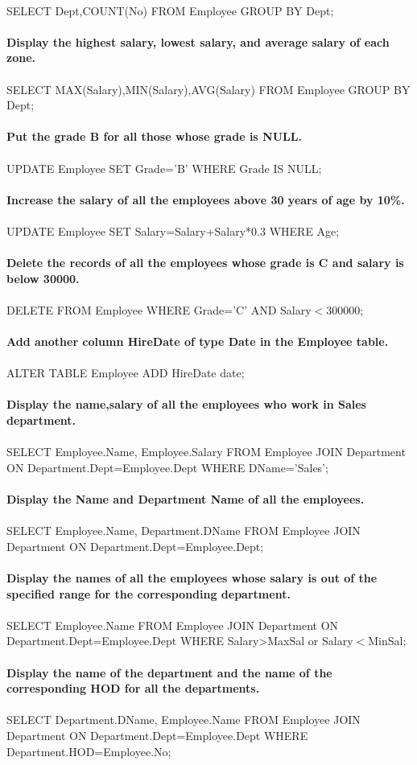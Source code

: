 \documentclass[
a4paper]{article}
\begin{document}
\begin{large}
\\
SELECT Dept,COUNT(No) FROM Employee GROUP BY Dept;\\
\\
\textbf{Display the highest salary, lowest salary, and average salary of each zone.}\\
\\
SELECT MAX(Salary),MIN(Salary),AVG(Salary) FROM Employee GROUP BY Dept;\\
\\
\textbf{Put the grade B for all those whose grade is NULL.}\\
\\
UPDATE Employee SET Grade='B' WHERE Grade IS NULL;\\
\\
\textbf{Increase the salary of all the employees above 30 years of age by 10\%.}\\
\\
UPDATE Employee SET Salary=Salary+Salary*0.3 WHERE Age;\\
\\
\textbf{Delete the records of all the employees whose grade is C and salary is below 30000.}\\
\\
DELETE FROM Employee WHERE Grade='C' AND Salary$<$300000;\\
\\
\textbf{Add another column HireDate of type Date in the Employee table.}\\
\\
ALTER TABLE Employee ADD HireDate date;\\
\\
\textbf{Display the name,salary of all the employees who work in Sales department.}\\
\\
SELECT Employee.Name, Employee.Salary FROM Employee JOIN Department ON Department.Dept=Employee.Dept WHERE DName='Sales';\\
\\
\textbf{Display the Name and Department Name of all the employees.}\\
\\
SELECT Employee.Name, Department.DName FROM Employee JOIN Department ON Department.Dept=Employee.Dept;\\
\\
\textbf{Display the names of all the employees whose salary is out of the specified range for the corresponding department.}\\
\\
SELECT Employee.Name FROM Employee JOIN Department ON Department.Dept=Employee.Dept WHERE Salary>MaxSal or Salary$<$MinSal;\\
\\
\textbf{Display the name of the department and the name of the corresponding HOD for all the departments.}\\
\\
SELECT Department.DName, Employee.Name FROM Employee JOIN Department ON Department.Dept=Employee.Dept WHERE Department.HOD=Employee.No;\\
\\
	\end{large}
\end{document}
